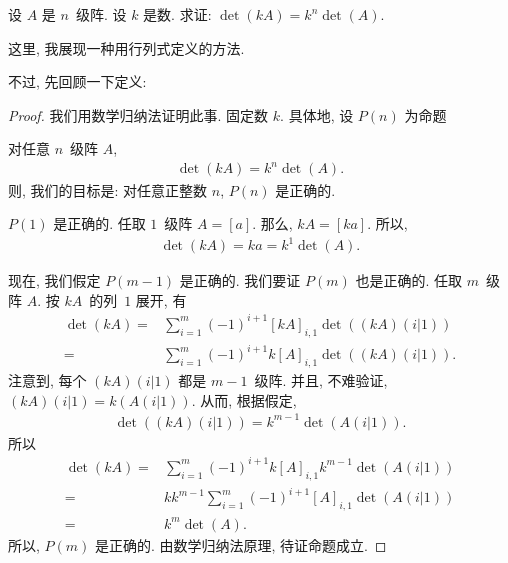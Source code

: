 \documentclass[%
    UTF8,%
    fontset=none,%
    punct=kaiming,%
    zihao=-4,%
    a4paper,%
    oneside,%
]{ctexbook}
\makeatletter
\renewenvironment{quotation}
{\list{}{\listparindent 2\ccwd%
\itemindent\listparindent
\leftmargin\rightmargin
\parsep\z@ \@plus\p@}%
\item\relax}
{\endlist}
\makeatother
\begin{document}
\begin{example}
    设 \(A\) 是 \(n\)~级阵.
    设 \(k\) 是数.
    求证: \(\det {(kA)} = k^n \det {(A)}\).
\end{example}

这里, 我展现一种用行列式定义的方法.

不过, 先回顾一下定义:

\DefinitionDeterminants*

\begin{proof}
    我们用数学归纳法证明此事.
    固定数 \(k\).
    具体地, 设 \(P(n)\) 为命题
    \begin{quotation}
        对任意 \(n\)~级阵 \(A\),
        \begin{align*}
            \det {(kA)} = k^n \det {(A)}.
        \end{align*}
    \end{quotation}
    则, 我们的目标是:
    对任意正整数 \(n\), \(P(n)\) 是正确的.

    \(P(1)\) 是正确的.
    任取 \(1\)~级阵 \(A = [a]\).
    那么, \(kA = [ka]\).
    所以,
    \begin{align*}
        \det {(kA)} = ka = k^1 \det {(A)}.
    \end{align*}

    现在, 我们假定 \(P(m-1)\) 是正确的.
    我们要证 \(P(m)\) 也是正确的.
    任取 \(m\)~级阵 \(A\).
    按 \(kA\)~的列~\(1\) 展开, 有
    \begin{align*}
        \det {(kA)}
        = {} & \sum_{i = 1}^{m}
        {(-1)^{i+1} [kA]_{i,1} \det {((kA) (i|1))}}
        \\
        = {} & \sum_{i = 1}^{m}
        {(-1)^{i+1} k [A]_{i,1} \det {((kA) (i|1))}}.
    \end{align*}
    注意到, 每个 \((kA)(i|1)\) 都是 \(m-1\)~级阵.
    并且, 不难验证, \((kA)(i|1) = k(A(i|1))\).
    从而, 根据假定,
    \begin{align*}
        \det {((kA)(i|1))} = k^{m-1} \det {(A(i|1))}.
    \end{align*}
    所以
    \begin{align*}
        \det {(kA)}
        = {} & \sum_{i = 1}^{m}
        {(-1)^{i+1} k [A]_{i,1} k^{m-1} \det {(A(i|1))}}
        \\
        = {} & k k^{m-1}
        \sum_{i = 1}^{m}
        {(-1)^{i+1} [A]_{i,1} \det {(A(i|1))}}
        \\
        = {} & k^m \det {(A)}.
    \end{align*}
    所以, \(P(m)\) 是正确的.
    由数学归纳法原理, 待证命题成立.
\end{proof}
\end{document}
